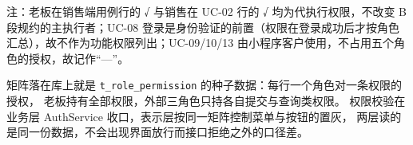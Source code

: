 \documentclass[12pt, a4paper]{ctexart}
\newcommand{\code}[1]{\texttt{\small #1}}
\begin{document}
注：老板在销售端用例行的 √ 与销售在 UC-02 行的 √ 均为代执行权限，不改变 B 段规约的主执行者；UC-08 登录是身份验证的前置（权限在登录成功后才按角色汇总），故不作为功能权限列出；UC-09/10/13 由小程序客户使用，不占用五个角色的授权，故记作“—”。

矩阵落在库上就是 \code{t\_role\_permission} 的种子数据：每行一个角色对一条权限的授权，
老板持有全部权限，外部三角色只持各自提交与查询类权限。
权限校验在业务层 AuthService 收口，表示层按同一矩阵控制菜单与按钮的置灰，
两层读的是同一份数据，不会出现界面放行而接口拒绝之外的口径差。
\end{document}
